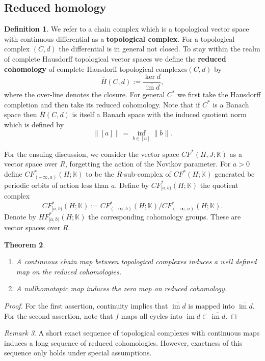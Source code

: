 \documentclass[11pt]{amsart}
\newcommand{\K}{\mathbb{K}}
\DeclareMathOperator{\im}{im}
\newtheorem{tm}{Theorem}[section]
\theoremstyle{definition}
\newtheorem{df}[tm]{Definition}
\theoremstyle{remark}
\newtheorem{rem}[tm]{Remark}
\begin{document}
\subsection{Reduced homology}
\begin{df}
We refer to a chain complex which is a topological vector space with continuous differential as a \textbf{topological complex}. For a topological complex $(C,d)$ the differential is in general not closed. To stay within the realm of complete Hausdorff topological vector spaces we define the \textbf{reduced cohomology} of  complete Hausdorff topological complexes$(C,d)$ by
\[
\overline{H}(C,d):=\frac{\ker d}{\overline{\im d}},
\]
where the over-line denotes the closure. For general $C^*$  we first take the Hausdorff completion and then take its reduced cohomology. Note that if $C^*$ is a Banach space then $\overline{H}(C,d)$ is itself a Banach space with the induced quotient norm which is defined by
\[
\|[a]\|=\inf_{b\in[a]}\|b\|.
\]
\end{df}
For the ensuing discussion, we consider the vector space $CF^*(H,J;\K)$ as a vector space over $R$, forgetting the action of the Novikov parameter. For $a>0$ define $CF^*_{(-\infty,a)}(H;\K)$ to be the $R$-sub-complex of $CF^*(H;\K)$ generated be periodic orbits of action less than $a$. Define by $CF^*_{[a,b)}(H;\K)$ the quotient complex
\[
CF^*_{[a,b)}(H;\K):=CF^*_{(-\infty,b)}(H;\K)/CF^*_{(-\infty,a)}(H;\K).
\]
Denote by $HF^*_{[a,b)}(H;\K)$  the corresponding cohomology groups. These are vector spaces over $R$.
\begin{tm}
\begin{enumerate}
\item A continuous chain map between topological complexes induces a well defined map on the reduced cohomologies.
\item A nullhomotopic map induces the zero map on reduced cohomology.
\end{enumerate}
\end{tm}
\begin{proof}
For the first assertion, continuity implies that $\overline{\im d}$ is mapped into $\overline{\im d}$. For the second assertion, note that $f$ maps all cycles into $\im d\subset\overline{\im d}$.
\end{proof}
\begin{rem}
A short exact sequence of topological complexes with continuous maps induces a long sequence of reduced cohomologies. However, exactness of this sequence only holds under special assumptions.
\end{rem}
\end{document}
